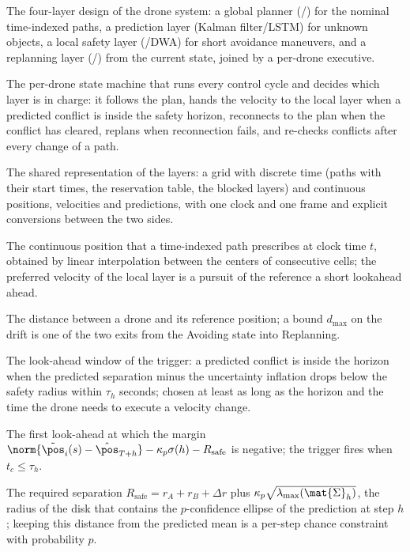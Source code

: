 \item[Hybrid collision-avoidance architecture] The four-layer design of the drone system: a global planner (\cbs/\ecbs) for the nominal time-indexed paths, a prediction layer (Kalman filter/LSTM) for unknown objects, a local safety layer (\orca/DWA) for short avoidance maneuvers, and a replanning layer (\dstarlite/\astar) from the current state, joined by a per-drone executive.
\item[Executive] The per-drone state machine that runs every control cycle and decides which layer is in charge: it follows the plan, hands the velocity to the local layer when a predicted conflict is inside the safety horizon, reconnects to the plan when the conflict has cleared, replans when reconnection fails, and re-checks conflicts after every change of a path.
\item[Hybrid world model] The shared representation of the layers: a grid with discrete time (paths with their start times, the reservation table, the blocked layers) and continuous positions, velocities and predictions, with one clock and one frame and explicit conversions between the two sides.
\item[Reference position $\pos^{\mathrm{ref}}_i(t)$] The continuous position that a time-indexed path prescribes at clock time $t$, obtained by linear interpolation between the centers of consecutive cells; the preferred velocity of the local layer is a pursuit of the reference a short lookahead ahead.
\item[Drift $d_i(t)$] The distance between a drone and its reference position; a bound $d_{\max}$ on the drift is one of the two exits from the Avoiding state into Replanning.
\item[Safety horizon $\tau_h$] The look-ahead window of the trigger: a predicted conflict is inside the horizon when the predicted separation minus the uncertainty inflation drops below the safety radius within $\tau_h$ seconds; chosen at least as long as the \orca horizon and the time the drone needs to execute a velocity change.
\item[Predicted time to collision $t_c$] The first look-ahead at which the margin $\norm{\tilde{\pos}_i(s) - \hat{\pos}_{T+h}} - \kappa_p\sigma(h) - R_{\mathrm{safe}}$ is negative; the trigger fires when $t_c \le \tau_h$.
\item[Inflated safety radius $d^{\mathrm{safe}}_h$] The required separation $R_{\mathrm{safe}} = r_A + r_B + \Delta r$ plus $\kappa_p\sqrt{\lambda_{\max}(\mat{\Sigma}_h)}$, the radius of the disk that contains the $p$-confidence ellipse of the prediction at step $h$; keeping this distance from the predicted mean is a per-step chance constraint with probability $p$.

